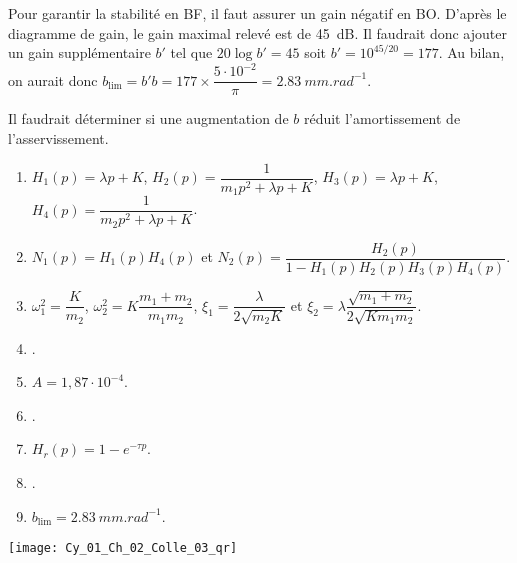 \ifprof
\begin{corrige}
Pour garantir la stabilité en BF, il faut assurer un gain négatif en BO. D'après le diagramme de gain, le gain maximal relevé est de \SI{45}{dB}. Il faudrait donc ajouter un gain supplémentaire $b'$ tel que $20\log b' = 45$ soit $b'=10^{45/20}=177$. Au bilan, on aurait donc $b_{\text{lim}}=b' b = 177\times \dfrac{5\cdot 10^{-2}}{\pi}=
\SI{2,83}{mm.rad^{-1}}$.

Il faudrait déterminer si une augmentation de $b$ réduit l'amortissement de l'asservissement. 
\end{corrige}
\else
\fi

\ifprof
\else
\ifcolle
\else
\begin{solution}
\begin{enumerate}
\item $H_1(p)=\lambda p+K$, $H_2(p)=\dfrac{1}{m_1p^2  + \lambda p+K}$, $H_3(p)=\lambda p+K$,  $H_4(p)=\dfrac{1}{m_2p^2  + \lambda p+K}$.
\item $N_1(p)=H_1(p)H_4(p)$ et $N_2(p)=\dfrac{H_2(p)}{1-H_1(p)H_2(p) H_3(p)H_4(p)}$.
\item 	$\omega_1^2=\dfrac{K}{m_2}$, 
	$\omega_2^2=K\dfrac{m_1+m_2}{m_1m_2}$, 
	$\xi_1=\dfrac{\lambda}{2  \sqrt{m_2K}}$ et 
	$\xi_2=\lambda\dfrac{\sqrt{m_1+ m_2}}{2\sqrt{Km_1m_2}}$.
\item .
\item 	$A=1,87\cdot 10^{-4}$.
\item 	.
\item 	$H_r(p)=1-e^{-\tau p}$.
\item 	.
\item $b_{\text{lim}}=\SI{2,83}{mm.rad^{-1}}$.
\end{enumerate}
\end{solution}
\fi
\fi

\ifprof
\else
\begin{marginfigure}[-3cm]
\centering
\texttt{[image: Cy\_01\_Ch\_02\_Colle\_03\_qr]}
\end{marginfigure}
\fi



